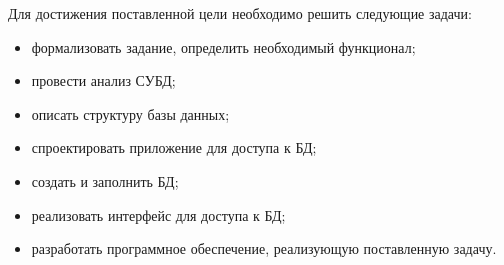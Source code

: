 Для достижения поставленной цели необходимо решить следующие задачи:
\begin{itemize}
	\item формализовать задание, определить необходимый функционал;
	\item провести анализ СУБД; 
	\item описать структуру базы данных;
	\item спроектировать приложение для доступа к БД;
	\item создать и заполнить БД;
	\item реализовать интерфейс для доступа к БД;
	\item разработать программное обеспечение, реализующую поставленную задачу.
\end{itemize}